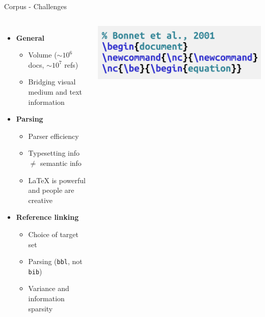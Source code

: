 \documentclass[en,16:9,smallfoot]{sdqbeamer}
\begin{document}

   \begin{frame}{Corpus - Challenges}
   \begin{columns}
        \begin{itemize}
            \item \textbf{General}
            \begin{itemize}
                \item Volume ($\sim10^6$ docs, $\sim10^7$ refs)
                \item Bridging visual medium and text information  %
            \end{itemize}
            \item \textbf{Parsing}
            \begin{itemize}
                \item Parser efficiency
                \item Typesetting info $\neq$ semantic info
                \item \LaTeX{} is powerful and people are creative
            \end{itemize}
            \item \textbf{Reference linking}
            \begin{itemize}
                \item Choice of target set
                \item Parsing {\color{contextgrey}(\texttt{bbl}, not \texttt{bib})}
                \item Variance and information sparsity
            \end{itemize}
        \end{itemize}
          \centering
          \includegraphics[width=0.7\linewidth]{imgs/renewcommand_v2}


\end{columns}
\end{frame}
\end{document}
